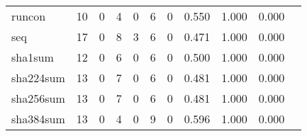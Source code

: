 \begin{longtable}{lp{1.2cm}p{1.2cm}p{1.2cm}p{1.2cm}p{1.2cm}p{1.2cm}p{1.2cm}p{1.2cm}p{1.2cm}p{1.2cm}}
runcon    &                                    10 &                                                  0 &                                                  4 &                                                  0 &                                                  6 &                                                  0 &                                         0.550 &                                              1.000 &                                              0.000 \\
seq       &                                    17 &                                                  0 &                                                  8 &                                                  3 &                                                  6 &                                                  0 &                                         0.471 &                                              1.000 &                                              0.000 \\
sha1sum   &                                    12 &                                                  0 &                                                  6 &                                                  0 &                                                  6 &                                                  0 &                                         0.500 &                                              1.000 &                                              0.000 \\
sha224sum &                                    13 &                                                  0 &                                                  7 &                                                  0 &                                                  6 &                                                  0 &                                         0.481 &                                              1.000 &                                              0.000 \\
sha256sum &                                    13 &                                                  0 &                                                  7 &                                                  0 &                                                  6 &                                                  0 &                                         0.481 &                                              1.000 &                                              0.000 \\
sha384sum &                                    13 &                                                  0 &                                                  4 &                                                  0 &                                                  9 &                                                  0 &                                         0.596 &                                              1.000 &                                              0.000 \\

\end{longtable}
